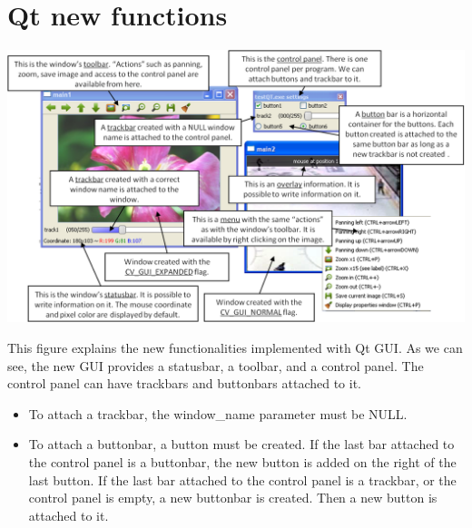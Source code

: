 %
%
%
%











\section{Qt new functions}

\includegraphics[width=1.1\textwidth]{pics/Qt_GUI.png}

This figure explains the new functionalities implemented with Qt GUI. As we can see, the new GUI provides a statusbar, a toolbar, and a control panel. The control panel can have trackbars and buttonbars attached to it.
\begin{itemize}
    \item  To attach a trackbar, the window\_name parameter must be NULL.
    \item  To attach a buttonbar, a button must be created. 
If the last bar attached to the control panel is a buttonbar, the new button is added on the right of the last button. 
If the last bar attached to the control panel is a trackbar, or the control panel is empty, a new buttonbar is created. Then a new button is attached to it.
\end{itemize}

